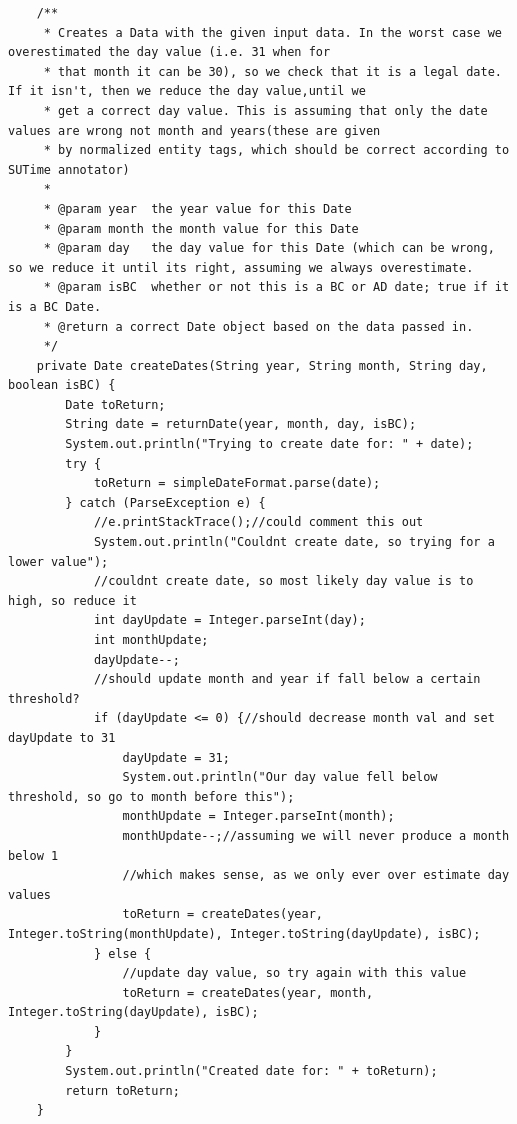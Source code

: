 \begin{lstlisting}
    /**
     * Creates a Data with the given input data. In the worst case we overestimated the day value (i.e. 31 when for
     * that month it can be 30), so we check that it is a legal date. If it isn't, then we reduce the day value,until we
     * get a correct day value. This is assuming that only the date values are wrong not month and years(these are given
     * by normalized entity tags, which should be correct according to SUTime annotator)
     *
     * @param year  the year value for this Date
     * @param month the month value for this Date
     * @param day   the day value for this Date (which can be wrong, so we reduce it until its right, assuming we always overestimate.
     * @param isBC  whether or not this is a BC or AD date; true if it is a BC Date.
     * @return a correct Date object based on the data passed in.
     */
    private Date createDates(String year, String month, String day, boolean isBC) {
        Date toReturn;
        String date = returnDate(year, month, day, isBC);
        System.out.println("Trying to create date for: " + date);
        try {
            toReturn = simpleDateFormat.parse(date);
        } catch (ParseException e) {
            //e.printStackTrace();//could comment this out
            System.out.println("Couldnt create date, so trying for a lower value");
            //couldnt create date, so most likely day value is to high, so reduce it
            int dayUpdate = Integer.parseInt(day);
            int monthUpdate;
            dayUpdate--;
            //should update month and year if fall below a certain threshold?
            if (dayUpdate <= 0) {//should decrease month val and set dayUpdate to 31
                dayUpdate = 31;
                System.out.println("Our day value fell below threshold, so go to month before this");
                monthUpdate = Integer.parseInt(month);
                monthUpdate--;//assuming we will never produce a month  below 1
                //which makes sense, as we only ever over estimate day values
                toReturn = createDates(year, Integer.toString(monthUpdate), Integer.toString(dayUpdate), isBC);
            } else {
                //update day value, so try again with this value
                toReturn = createDates(year, month, Integer.toString(dayUpdate), isBC);
            }
        }
        System.out.println("Created date for: " + toReturn);
        return toReturn;
    }


\end{lstlisting}
